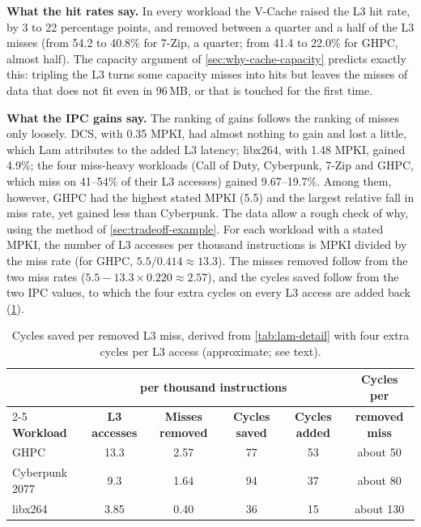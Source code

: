\textbf{What the hit rates say.} In every workload the V-Cache raised the L3 hit rate, by 3 to 22 percentage points, and removed between a quarter and a half of the L3 misses (from 54.2 to 40.8\% for 7-Zip, a quarter; from 41.4 to 22.0\% for GHPC, almost half). The capacity argument of \cref{sec:why-cache-capacity} predicts exactly this: tripling the L3 turns some capacity misses into hits but leaves the misses of data that does not fit even in 96\,MB, or that is touched for the first time.

\textbf{What the IPC gains say.} The ranking of gains follows the ranking of misses only loosely. DCS, with 0.35 MPKI, had almost nothing to gain and lost a little, which Lam attributes to the added L3 latency; libx264, with 1.48 MPKI, gained 4.9\%; the four miss-heavy workloads (Call of Duty, Cyberpunk, 7-Zip and GHPC, which miss on 41--54\% of their L3 accesses) gained 9.67--19.7\%. Among them, however, GHPC had the highest stated MPKI (5.5) and the largest relative fall in miss rate, yet gained less than Cyberpunk. The data allow a rough check of why, using the method of \cref{sec:tradeoff-example}. For each workload with a stated MPKI, the number of L3 accesses per thousand instructions is MPKI divided by the miss rate (for GHPC, $5.5/0.414 \approx 13.3$). The misses removed follow from the two miss rates ($5.5 - 13.3 \times 0.220 \approx 2.57$), and the cycles saved follow from the two IPC values, to which the four extra cycles on every L3 access are added back (\cref{tab:lam-per-miss}).

\begin{table}[htbp]
  \centering
  \caption[Cycles saved per removed L3 miss]{Cycles saved per removed L3 miss, derived from \cref{tab:lam-detail} with four extra cycles per L3 access (approximate; see text).}
  \label{tab:lam-per-miss}
  \small
  \begin{tabular}{@{}lccccc@{}}
    \toprule
    & \multicolumn{4}{c}{\textbf{per thousand instructions}} & \textbf{Cycles per} \\
    \cmidrule(lr){2-5}
    \textbf{Workload} & \textbf{L3 accesses} & \textbf{Misses removed} & \textbf{Cycles saved} & \textbf{Cycles added} & \textbf{removed miss} \\
    \midrule
    GHPC & 13.3 & 2.57 & 77 & 53 & about 50 \\
    Cyberpunk 2077 & 9.3 & 1.64 & 94 & 37 & about 80 \\
    libx264 & 3.85 & 0.40 & 36 & 15 & about 130 \\
    \bottomrule
  \end{tabular}
\end{table}

